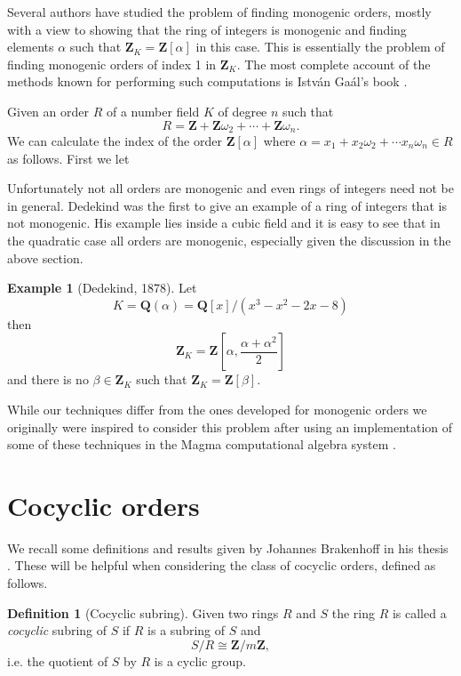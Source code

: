 \documentclass[12pt,a4paper,abstracton,bibtotoc]{scrreprt}
\theoremstyle{definition}
\newtheorem{defn}{Definition}
\newtheorem{ex}{Example}
\newcommand{\QQ}{\mathbf{Q}}
\newcommand{\ZZ}{\mathbf{Z}}
\begin{document}
Several authors have studied the problem of finding monogenic orders, mostly with a view to showing that the ring of integers is monogenic and finding elements $\alpha$ such that $\ZZ_K = \ZZ[\alpha]$ in this case.
This is essentially the problem of finding monogenic orders of index 1 in $\ZZ_K$.
The most complete account of the methods known for performing such computations is Istv\'an Ga\'al's book \cite{gaal}.

Given an order $R$ of a number field $K$ of degree $n$ such that
\[
R = \ZZ + \ZZ\omega_2 + \cdots + \ZZ\omega_n.
\]
We can calculate the index of the order $\ZZ[\alpha]$ where $\alpha = x_1 + x_2\omega_2 + \cdots x_n\omega_n\in R$ as follows.
First we let

Unfortunately not all orders are monogenic and even rings of integers need not be in general.
Dedekind was the first to give an example of a ring of integers that is not monogenic.
His example lies inside a cubic field and it is easy to see that in the quadratic case all orders are monogenic, especially given the discussion in the above section.

\begin{ex}[Dedekind, 1878]
Let 
\[
K = \QQ(\alpha) = \QQ[x]/(x^3 -x^2 -2x-8)
\]
then
\[
\ZZ_K=\ZZ\left[ \alpha,\frac{\alpha + \alpha^2}{2}\right]
\]
and there is no $\beta\in \ZZ_K$ such that $\ZZ_K=\ZZ[\beta]$. %
\end{ex}


While our techniques differ from the ones developed for monogenic orders we originally were inspired to consider this problem after using an implementation of some of these techniques in the Magma computational algebra system \cite{magma}.


\section{Cocyclic orders}
\label{sec:cocyc}
We recall some definitions and results given by Johannes Brakenhoff in his thesis \cite{brakenhoff}.
These will be helpful when considering the class of cocyclic orders, defined as follows.

\begin{defn}[Cocyclic subring]
Given two rings $R$ and $S$ the ring $R$ is called a \emph{cocyclic} subring of $S$ if $R$ is a subring of $S$ and
\[
S/R \cong \ZZ/m\ZZ,
\]
i.e. the quotient of $S$ by $R$ is a cyclic group.
\end{defn}
\end{document}
